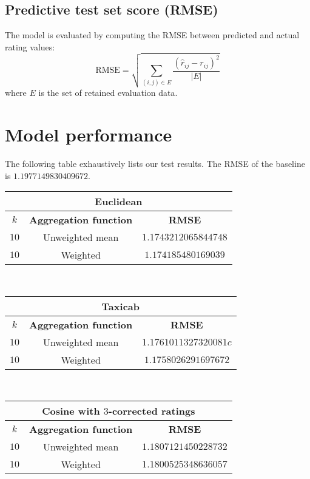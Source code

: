 \documentclass[final]{cvpr}
\begin{document}
\subsection{Predictive test set score (RMSE)}
The model is evaluated by computing the RMSE between predicted and actual rating values:
$$ \text{RMSE} = \sqrt{\sum_{(i, j) \in E} \frac{{(\hat r_{ij} - r_{ij})}^2}{\left| E \right|}} $$
where $E$ is the set of retained evaluation data.

\section{Model performance}
The following table exhaustively lists our test results.
The RMSE of the baseline is $1.1977149830409672$.

\vspace{1em}

\begin{tabular}{| c | c | c |}
    \hline
    \multicolumn{3}{|c|}{\textbf{Euclidean}}\\
    \hline
		$k$ & \textbf{Aggregation function} & \textbf{RMSE}\\
    \hline
    $10$ & Unweighted mean & $1.1743212065844748$\\
    \hline
    $10$ & Weighted & $1.174185480169039$\\
    \hline
\end{tabular}\\

\vspace{1em}

\begin{tabular}{| c | c | c |}
    \hline
    \multicolumn{3}{|c|}{\textbf{Taxicab}}\\
    \hline
		$k$ & \textbf{Aggregation function} & \textbf{RMSE}\\
    \hline
    $10$ & Unweighted mean & $1.1761011327320081c$\\
    \hline
    $10$ & Weighted & $1.1758026291697672$\\
    \hline
\end{tabular}\\

\vspace{1em}

\begin{tabular}{| c | c | c |}
    \hline
    \multicolumn{3}{|c|}{\textbf{Cosine with $3$-corrected ratings}}\\
    \hline
		$k$ & \textbf{Aggregation function} & \textbf{RMSE}\\
    \hline
    $10$ & Unweighted mean & $1.1807121450228732$\\
    \hline
    $10$ & Weighted & $1.1800525348636057$\\
    \hline
\end{tabular}\\
\end{document}
